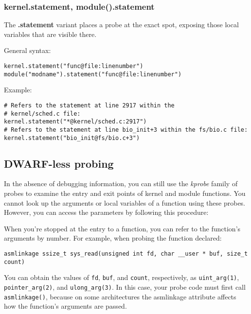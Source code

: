 \documentclass[twoside,english]{article}
\newenvironment{vindent}
{\begin{list}{}{\setlength{\listparindent}{6pt}}
\item[]}
{\end{list}}
\begin{document}
\subsubsection{kernel.statement, module().statement}
The \textbf{.statement} variant places a probe at the exact spot, exposing those local
variables that are visible there.

General syntax:

\begin{vindent}
\begin{verbatim}
kernel.statement("func@file:linenumber")
module("modname").statement("func@file:linenumber")
\end{verbatim}
\end{vindent}
Example:

\begin{vindent}
\begin{verbatim}
# Refers to the statement at line 2917 within the
# kernel/sched.c file:
kernel.statement("*@kernel/sched.c:2917")
# Refers to the statement at line bio_init+3 within the fs/bio.c file:
kernel.statement("bio_init@fs/bio.c+3")
\end{verbatim}
\end{vindent}


\subsection{DWARF-less probing}

In the absence of debugging information, you can still use the
\emph{kprobe} family of probes to examine the entry and exit points of
kernel and module functions. You cannot look up the arguments or local
variables of a function using these probes. However, you can access
the parameters by following this procedure:

When you're stopped at the entry to a function, you can refer to the 
function's arguments by number. For example, when probing the function 
declared:

\begin{vindent}
\begin{verbatim}
asmlinkage ssize_t sys_read(unsigned int fd, char __user * buf, size_t
count)
\end{verbatim}
\end{vindent}

You can obtain the values of \texttt{fd}, \texttt{buf}, and
\texttt{count}, respectively, as \texttt{uint\_arg(1)},
\texttt{pointer\_arg(2)}, and \texttt{ulong\_arg(3)}. In this case, your
probe code must first call \texttt{asmlinkage()}, because on some
architectures the asmlinkage attribute affects how the function's
arguments are passed.
\end{document}
